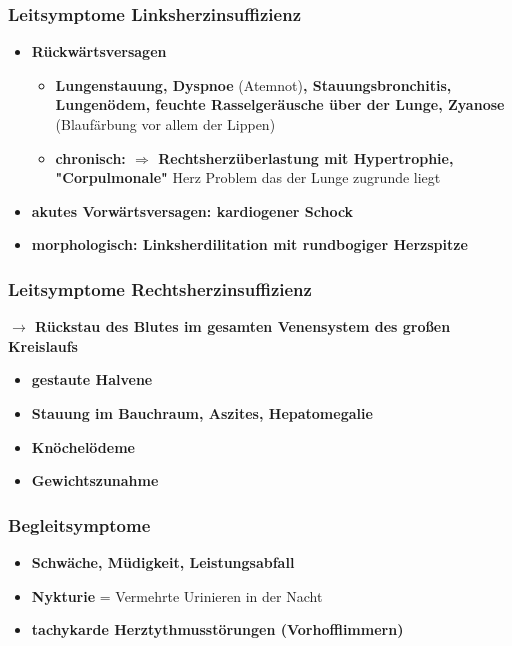 	\subsubsection{Leitsymptome Linksherzinsuffizienz}
		\begin{itemize}
			\item \textbf{Rückwärtsversagen}
				\begin{itemize}
					\item \textbf{Lungenstauung, Dyspnoe} (Atemnot)\textbf{, Stauungsbronchitis, Lungenödem, feuchte Rasselgeräusche über der Lunge, Zyanose} (Blaufärbung vor allem der Lippen)
					\item \textbf{chronisch: $\Rightarrow$ Rechtsherzüberlastung mit Hypertrophie, "Corpulmonale"} Herz Problem das der Lunge zugrunde liegt
				\end{itemize}
			\item \textbf{akutes Vorwärtsversagen: kardiogener Schock}
			\item \textbf{morphologisch: Linksherdilitation mit rundbogiger Herzspitze}
		\end{itemize}
	\subsubsection{Leitsymptome Rechtsherzinsuffizienz}
		\textbf{$\rightarrow$ Rückstau des Blutes im gesamten Venensystem des großen Kreislaufs}
		\begin{itemize}
			\item \textbf{gestaute Halvene}
			\item \textbf{Stauung im Bauchraum, Aszites, Hepatomegalie}
			\item \textbf{Knöchelödeme}
			\item \textbf{Gewichtszunahme}
		\end{itemize}
	\subsubsection{Begleitsymptome}
		\begin{itemize}
			\item \textbf{Schwäche, Müdigkeit, Leistungsabfall}
			\item \textbf{Nykturie} = Vermehrte Urinieren in der Nacht
			\item \textbf{tachykarde Herztythmusstörungen (Vorhofflimmern)}
		\end{itemize}
